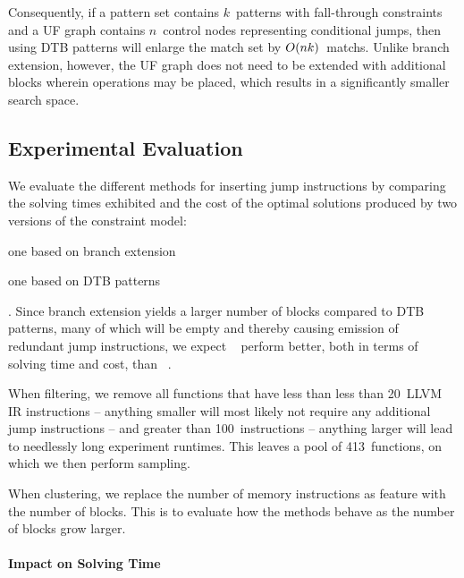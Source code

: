 Consequently, if a \gls{pattern set} contains $k$~\glspl{pattern} with
\gls{fall-through} \glspl{constraint} and a \gls{UF graph} contains
$n$~\glspl{control node} representing conditional jumps, then using \glspl{DTB
  pattern} will enlarge the \gls{match set} by $O(nk)$~\glspl{match}.
%
Unlike \gls{branch extension}, however, the \gls{UF graph} does not need to be
extended with additional \glspl{block} wherein \glspl{operation} may be placed,
which results in a significantly smaller \gls{search space}.


\subsection{Experimental Evaluation}

We evaluate the different methods for inserting jump \glspl{instruction} by
comparing the solving times exhibited and the cost of the optimal
\glspl{solution} produced by two versions of the \gls{constraint model}:
%
\begin{modelList}
  \item {}
    one based on \gls{branch extension}
  \item {}
    one based on \glspl{DTB pattern}
\end{modelList}.
%
Since \gls{branch extension} yields a larger number of \glspl{block} compared to
\glspl{DTB pattern}, many of which will be empty and thereby causing emission of
redundant jump \glspl{instruction}, we expect ~ perform better, both in terms of solving time
and cost, than ~.

When filtering, we remove all \glspl{function} that have less than less than
\num{20}~\gls{LLVM} \gls{IR} \glspl{instruction} -- anything smaller will most
likely not require any additional jump \glspl{instruction} -- and greater than
\num{100}~\glspl{instruction} -- anything larger will lead to needlessly long
experiment runtimes.
%
This leaves a pool of \num{413}~\glspl{function}, on which we then perform
sampling.

When clustering, we replace the number of memory \glspl{instruction} as feature
with the number of \glspl{block}.
%
This is to evaluate how the methods behave as the number of \glspl{block} grow
larger.


\paragraph{Impact on Solving Time}

